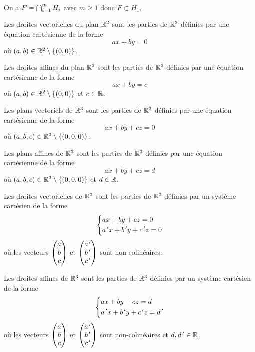 \begin{dem}~\\
On a \(F=\bigcap_{i=1}^mH_i\) avec \(m\geq1\) donc \(F\subset H_1\).
\end{dem}

\begin{ex}
Les droites vectorielles du plan \(\mathbb{R}^2\) sont les parties de \(\mathbb{R}^2\) définies par une équation cartésienne de la forme \[ax+by=0\] où \(\left(a,b\right)\in\mathbb{R}^2\setminus\left\lbrace\left(0,0\right)\right\rbrace\).
\end{ex}

\begin{ex}
Les droites affines du plan \(\mathbb{R}^2\) sont les parties de \(\mathbb{R}^2\) définies par une équation cartésienne de la forme \[ax+by=c\] où \(\left(a,b\right)\in\mathbb{R}^2\setminus\left\lbrace\left(0,0\right)\right\rbrace\) et \(c\in\mathbb{R}\).
\end{ex}

\begin{ex}
Les plans vectoriels de \(\mathbb{R}^3\) sont les parties de \(\mathbb{R}^3\) définies par une équation cartésienne de la forme \[ax+by+cz=0\] où \(\left(a,b,c\right)\in\mathbb{R}^3\setminus\left\lbrace\left(0,0,0\right)\right\rbrace\).
\end{ex}

\begin{ex}
Les plans affines de \(\mathbb{R}^3\) sont les parties de \(\mathbb{R}^3\) définies par une équation cartésienne de la forme \[ax+by+cz=d\] où \(\left(a,b,c\right)\in\mathbb{R}^3\setminus\left\lbrace\left(0,0,0\right)\right\rbrace\) et \(d\in\mathbb{R}\).
\end{ex}

\begin{ex}
Les droites vectorielles de \(\mathbb{R}^3\) sont les parties de \(\mathbb{R}^3\) définies par un système cartésien de la forme \[\begin{dcases}
ax+by+cz=0 \\
a^{\,\prime} x+b^{\,\prime} y+c^{\,\prime} z=0
\end{dcases}\] où les vecteurs \(\begin{pmatrix}a\\b\\c\end{pmatrix}\) et \(\begin{pmatrix}a^{\,\prime}\\b^{\,\prime}\\c^{\,\prime}\end{pmatrix}\) sont non-colinéaires.
\end{ex}

\begin{ex}
Les droites affines de \(\mathbb{R}^3\) sont les parties de \(\mathbb{R}^3\) définies par un système cartésien de la forme \[\begin{dcases}
ax+by+cz=d \\
a^{\,\prime} x+b^{\,\prime} y+c^{\,\prime} z=d^{\,\prime}
\end{dcases}\] où les vecteurs \(\begin{pmatrix}a\\b\\c\end{pmatrix}\) et \(\begin{pmatrix}a^{\,\prime}\\b^{\,\prime}\\c^{\,\prime}\end{pmatrix}\) sont non-colinéaires et \(d,d^{\,\prime}\in\mathbb{R}\).
\end{ex}